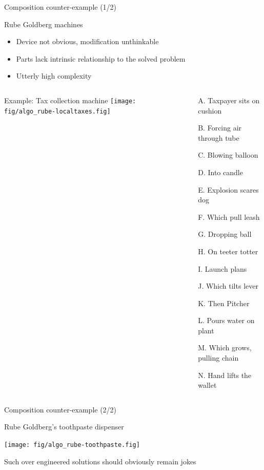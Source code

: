 \begin{frame}[squeeze]{Composition counter-example (1/2)}
  \begin{block}{Rube Goldberg machines}
    \begin{itemize}
    \item Device not obvious, modification unthinkable
    \item Parts lack intrinsic relationship to the solved problem
    \item Utterly high complexity
    \end{itemize}
  \end{block} \vspace{-\baselineskip}

  \begin{columns}
    \begin{column}{.6\linewidth}
      \begin{block}{Example: Tax collection machine}\bigskip
        \texttt{[image: fig/algo\_rube-localtaxes.fig]}
      \end{block}
    \end{column}
    \begin{column}{.4\linewidth}
      \begin{enumerate}
      \item[A.] Taxpayer sits on cushion
      \item[B.] Forcing air through tube
      \item[C.] Blowing balloon
      \item[D.] Into candle
      \item[E.] Explosion scares dog
      \item[F.] Which pull leash
      \item[G.] Dropping ball
      \item[H.] On teeter totter
      \item[I.] Launch plans
      \item[J.] Which tilts lever
      \item[K.] Then Pitcher
      \item[L.] Pours water on plant
      \item[M.] Which grows, pulling chain
      \item[N.] Hand lifts the wallet
      \end{enumerate}    
    \end{column}
  \end{columns}
\end{frame}
\begin{frame}[squeeze]{Composition counter-example (2/2)}
  \begin{block}{Rube Goldberg's toothpaste dispenser}\smallskip
    \centerline{\texttt{[image: fig/algo\_rube-toothpaste.fig]}}
  \end{block}

  Such over engineered solutions should obviously remain jokes
\end{frame}
